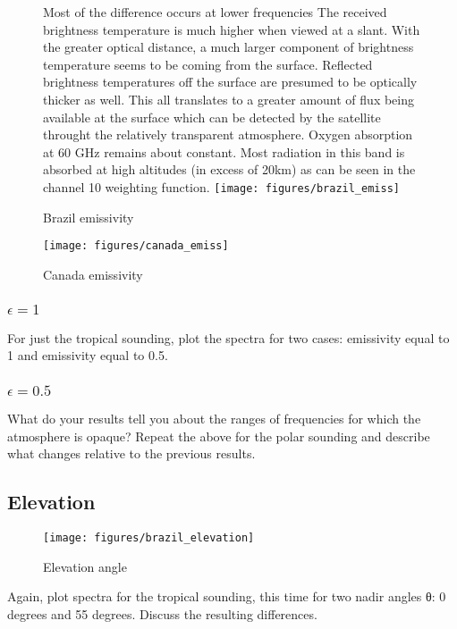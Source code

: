 \documentclass[twocol]{ametsoc}
\begin{document}
\begin{figure}Most of the difference occurs at lower frequencies
The received brightness temperature is much higher when viewed at a slant. With the greater optical distance, a much larger component of brightness temperature seems to be coming from the surface. Reflected brightness temperatures off the surface are presumed to be optically thicker as well. This all translates to a greater amount of flux being available at the surface which can be detected by the satellite throught the relatively transparent atmosphere.
Oxygen absorption at 60 GHz remains about constant. Most radiation in this band is absorbed at high altitudes (in excess of 20km) as can be seen in the channel 10 weighting function.
	\centering
	\texttt{[image: figures/brazil\_emiss]}
	\caption{Brazil emissivity}
	\label{fig:bemiss}
\end{figure}


\begin{figure}
	\centering
	\texttt{[image: figures/canada\_emiss]}
	\caption{Canada emissivity}
	\label{fig:cemiss}
\end{figure}

\subsubsection{$\epsilon = 1$}
For just the tropical sounding, plot the spectra for two cases:  emissivity equal to 1  and emissivity equal to 0.5.
\subsubsection{$\epsilon = 0.5$}
What do your results tell you about the ranges of frequencies for which the atmosphere is opaque?
Repeat the above for the polar sounding and describe what changes relative to the previous results.

\subsection{Elevation}


\begin{figure}
	\centering
	\texttt{[image: figures/brazil\_elevation]}
	\caption{Elevation angle}
	\label{fig:elevation}
\end{figure}

Again, plot spectra for the tropical sounding, this time for two nadir angles θ:  0 degrees and 55 degrees.  Discuss the resulting differences.
\end{document}
